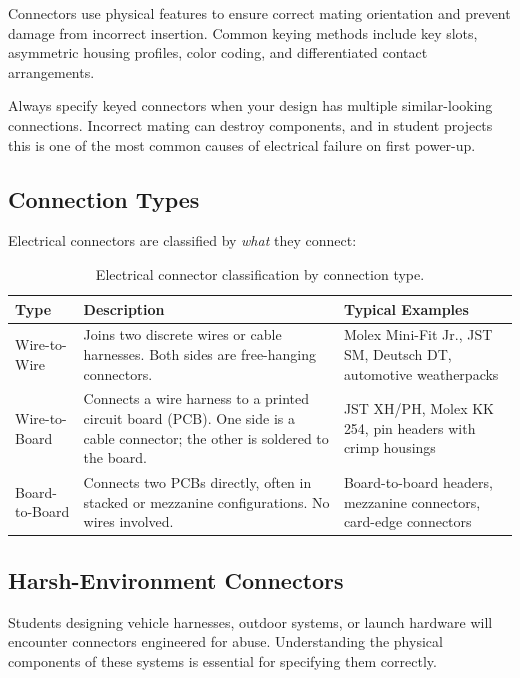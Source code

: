 Connectors use physical features to ensure correct mating orientation and prevent damage from incorrect insertion. Common keying methods include key slots, asymmetric housing profiles, color coding, and differentiated contact arrangements.

\begin{warningbox}
Always specify keyed connectors when your design has multiple similar-looking connections. Incorrect mating can destroy components, and in student projects this is one of the most common causes of electrical failure on first power-up.
\end{warningbox}


\subsection{Connection Types}

Electrical connectors are classified by \emph{what} they connect:

\begin{table}[htbp]
\centering
\small
\begin{tabularx}{\textwidth}{l X X}
  \toprule
  \textbf{Type} & \textbf{Description} & \textbf{Typical Examples} \\
  \midrule
  Wire-to-Wire & Joins two discrete wires or cable harnesses. Both sides are free-hanging connectors. &
    Molex Mini-Fit Jr., JST SM, Deutsch DT, automotive weatherpacks \\[4pt]
  Wire-to-Board & Connects a wire harness to a printed circuit board (PCB). One side is a cable connector; the other is soldered to the board. &
    JST XH/PH, Molex KK 254, pin headers with crimp\index{crimp termination} housings \\[4pt]
  Board-to-Board & Connects two PCBs directly, often in stacked or mezzanine configurations. No wires involved. &
    Board-to-board headers, mezzanine connectors, card-edge connectors \\
  \bottomrule
\end{tabularx}
\caption{Electrical connector classification by connection type.}
\end{table}



\subsection{Harsh-Environment Connectors}

Students designing vehicle harnesses, outdoor systems, or launch hardware will encounter connectors engineered for abuse. Understanding the physical components of these systems is essential for specifying them correctly.


